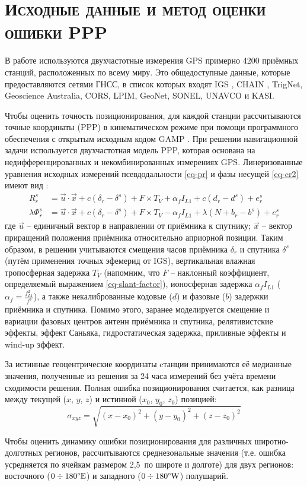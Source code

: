 \section{\textsc{Исходные данные и метод оценки ошибки PPP}}

В работе используются двухчастотные измерения GPS примерно 4200 приёмных станций, расположенных по всему миру.
Это общедоступные данные, которые предоставляются сетями ГНСС, в список которых входят IGS \cite{Dow2009}, CHAIN \cite{Jayachandran2009}, TrigNet, Geoscience Australia, CORS, LPIM, GeoNet, SONEL, UNAVCO и KASI.

Чтобы оценить точность позиционирования, для каждой станции рассчитываются точные координаты (PPP) в кинематическом режиме при помощи программного обеспечения с открытым исходным кодом GAMP \cite{Zhou2018}. 
При решении навигационной задачи используется двухчастотная модель PPP, которая основана на недифференцированных и некомбинированных измерениях GPS.
Линеризованные уравнения исходных измерений псевдодальности \eqref{eq-pr} и фазы несущей \eqref{eq-cr2} имеют вид \cite{Zhou2018}:
\begin{equation}
\begin{aligned}
R_r^s&=\vec{u}\cdot\vec{x}+c(\delta_r-\delta^s)+F\times T_V+\alpha_fI_{L1}+c(d_r-d^s)+e_r^s \\
\lambda\Phi_r^s&=\vec{u}\cdot\vec{x}+c(\delta_r-\delta^s)+F\times T_V-\alpha_fI_{L1}+\lambda(N+b_r-b^s)+e_r^s
\end{aligned}
\end{equation}  
где 
$\vec{u}$ -- единичный вектор в направлении от приёмника к спутнику; 
$\vec{x}$ -- вектор приращений положения приёмника относительно априорной позиции.
Таким образом, в решении учитываются смещения часов приёмника $\delta_r$ и спутника $\delta^s$ (путём применения точных эфемерид от IGS), вертикальная влажная тропосферная задержка $T_V$ (напомним, что $F$ -- наклонный коэффициент, определяемый выражением \eqref{eq-slant-factor}), ионосферная задержка $\alpha_fI_{L1}$ ($\alpha_f=\frac{f_{L1}^2}{f^2}$), а также некалиброванные кодовые ($d$) и фазовые ($b$) задержки приёмника и спутника.   
Помимо этого, заранее моделируется смещение и вариации фазовых центров антенн приёмника и спутника, релятивистские эффекты, эффект Саньяка, гидростатическая задержка, приливные эффекты и wind-up эффект.

За истинные геоцентрические координаты cтанции принимаются её медианные значения, полученные из решения за 24 часа измерений без учёта времени сходимости решения.
Полная ошибка позиционирования считается, как разница между текущей ($x$, $y$, $z$) и истинной ($x_0$, $y_0$, $z_0$) позицией:
\begin{equation}
\sigma_{xyz}=\sqrt{(x-x_0)^2+(y-y_0)^2+(z-z_0)^2}
\label{eq-3d-error}
\end{equation}

Чтобы оценить динамику ошибки позиционирования для различных широтно-долготных регионов, рассчитываются среднезональные значения (т.е. ошибка усредняется по ячейкам размером 2,5\degree~по широте и долготе) для двух регионов: восточного ($0\div180\degree \text{E}$) и западного ($0\div180\degree \text{W}$) полушарий.  